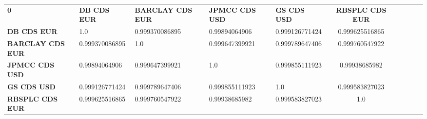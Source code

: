 \begin{center}
 \begin{tabular}{|l|l|l|l|l|c|c|c|c|c|}
\hline
\textbf{0} & \textbf{DB CDS EUR} & \textbf{BARCLAY CDS EUR} & \textbf{JPMCC CDS USD} & \textbf{GS CDS USD} & \textbf{RBSPLC CDS EUR}\\\hhline{|=|=|=|=|=|=|}
\textbf{DB CDS EUR} & 1.0 & 0.999370086895 & 0.99894064906 & 0.999126771424 & 0.999625516865\\
\textbf{BARCLAY CDS EUR} & 0.999370086895 & 1.0 & 0.999647399921 & 0.999789647406 & 0.999760547922\\
\textbf{JPMCC CDS USD} & 0.99894064906 & 0.999647399921 & 1.0 & 0.999855111923 & 0.99938685982\\
\textbf{GS CDS USD} & 0.999126771424 & 0.999789647406 & 0.999855111923 & 1.0 & 0.999583827023\\
\textbf{RBSPLC CDS EUR} & 0.999625516865 & 0.999760547922 & 0.99938685982 & 0.999583827023 & 1.0\\
\hline
\end{tabular}
\end{center}